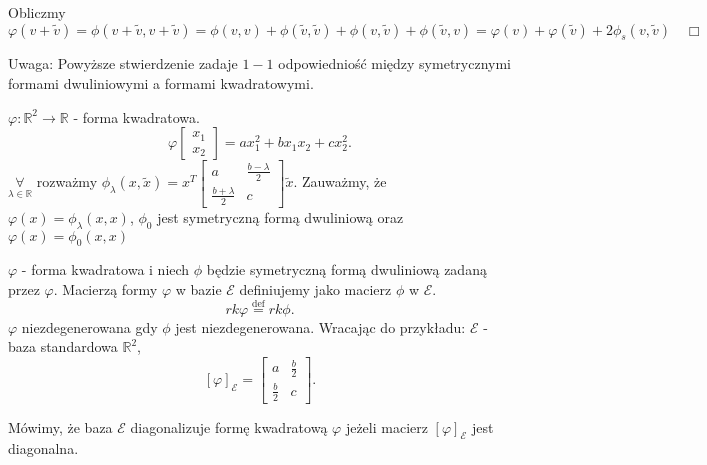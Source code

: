 \documentclass[../main.tex]{subfiles}
\begin{document}
    \begin{dowod}
        Obliczmy $\varphi(v+\tilde v) = \phi(v+\tilde v,v+\tilde v) = \phi(v,v) + \phi(\tilde v,\tilde v) + \phi(v,\tilde v) + \phi(\tilde v,v) = \varphi(v) + \varphi(\tilde v) + 2\phi_s(v,\tilde v) \quad\Box$
    \end{dowod}
    Uwaga: Powyższe stwierdzenie zadaje $1-1$ odpowiedniość między symetrycznymi formami dwuliniowymi a formami kwadratowymi.
    \begin{przyklad}
        $\varphi:\mathbb{R}^2\to\mathbb{R}$ - forma kwadratowa.\\
        \[
        \varphi\begin{bmatrix} x_1\\x_2 \end{bmatrix} = ax_1^2 + bx_1x_2 + cx_2^2
        .\]
        $\underset{\lambda\in\mathbb{R}}{\forall} $ rozważmy $\phi_\lambda(x,\tilde x) = x^T \begin{bmatrix} a&\frac{b-\lambda}{2}\\\frac{b+\lambda}{2}&c \end{bmatrix} \tilde x$. Zauważmy, że $\varphi(x) = \phi_\lambda(x,x)$, $\phi_0$ jest symetryczną formą dwuliniową oraz $\varphi(x) = \phi_0(x,x)$
    \end{przyklad}
    \begin{przyklad}
        $\varphi$ - forma kwadratowa i niech $\phi$ będzie  symetryczną formą dwuliniową zadaną przez $\varphi$. Macierzą formy $\varphi$ w bazie $\mathcal{E}$ definiujemy jako macierz $\phi $ w $\mathcal{E}$.
       \[
         rk \varphi \overset{\text{def}}{=} rk \phi
       .\]
       $\varphi$ niezdegenerowana gdy $\phi$ jest niezdegenerowana. Wracając do przykładu: $\mathcal{E}$ - baza standardowa $\mathbb{R}^2$, \[
           \left[ \varphi \right]_\mathcal{E} = \begin{bmatrix} a&\frac{b}{2}\\ \frac{b}{2}&c \end{bmatrix}
       .\]
    \end{przyklad}
    \begin{definicja}
        Mówimy, że baza $\mathcal{E}$ diagonalizuje formę kwadratową $\varphi$ jeżeli macierz $\left[ \varphi \right]_\mathcal{E} $ jest diagonalna.
    \end{definicja}
\end{document}
